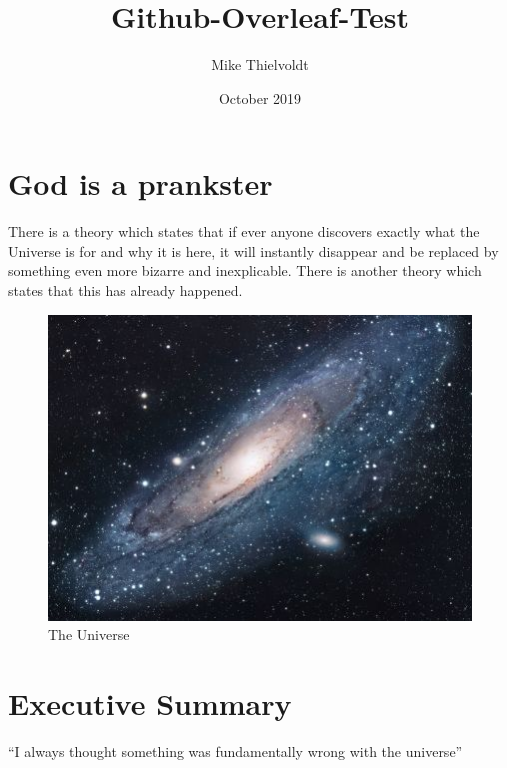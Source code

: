 \documentclass{article}
\title{Github-Overleaf-Test}
\author{Mike Thielvoldt}
\date{October 2019}
\begin{document}
\maketitle

\section{God is a prankster}
There is a theory which states that if ever anyone discovers exactly what the Universe is for and why it is here, it will instantly disappear and be replaced by something even more bizarre and inexplicable.
There is another theory which states that this has already happened.

\begin{figure}[h!]
\centering
\includegraphics[scale=1.7]{universe}
\caption{The Universe}
\label{fig:universe}
\end{figure}

\section{Executive Summary}
``I always thought something was fundamentally wrong with the universe'' \citep{adams1995hitchhiker}



\end{document}
